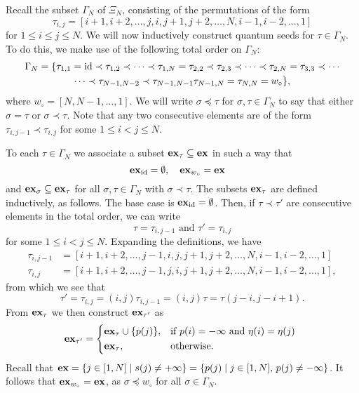 Recall the subset $\Gamma_N$ of $\Xi_N$, consisting of the permutations of the form
\begin{equation*}
	\tau_{i, j} = [i+1, i+2, \dots, j, i , j+1, j+2, \dots, N, i-1, i-2, \dots, 1]
\end{equation*}
%
for $1 \leq i \leq j \leq N$. We will now inductively construct quantum seeds for $\tau
	\in \Gamma_N$. To do this, we make use of the following total order on $\Gamma_N$:
\begin{multline*}
	\Gamma_N = \{\tau_{1,1} = \operatorname{id} \prec \tau_{1,2} \prec \cdots \prec \tau_{1, N} = \tau_{2,2} \prec \tau_{2,3} \prec \cdots \prec \tau_{2,N} = \tau_{3,3} \prec \cdots\\ \cdots \prec \tau_{N-1, N-2} \prec \tau_{N-1, N-1} \tau_{N-1, N} = \tau_{N, N} = w_\circ \},
\end{multline*}
%
where $w_\circ = [N, N-1, \dots, 1]$. We will write $\sigma \preceq \tau$ for $\sigma,
	\tau \in \Gamma_N$ to say that either $\sigma = \tau$ or $\sigma \prec \tau$. Note that
any two consecutive elements are of the form $\tau_{i, j-1} \prec \tau_{i, j}$ for some
$1 \leq i < j \leq N$.

To each $\tau \in \Gamma_N$ we associate a subset $\mathbf{ex}_\tau \subseteq \mathbf{ex}$ in such a
way that
\begin{equation*}
	\mathbf{ex}_{\operatorname{id}} = \emptyset, \quad \mathbf{ex}_{w_\circ} = \mathbf{ex} \quad
\end{equation*}
%
and $\mathbf{ex}_\sigma \subseteq \mathbf{ex}_\tau$ for all $\sigma, \tau \in \Gamma_N$ with $\sigma
	\prec \tau$. The subsets $\mathbf{ex}_\tau$ are defined inductively, as follows. The base case
is $\mathbf{ex}_{\operatorname{id}} = \emptyset$. Then, if $\tau \prec \tau'$ are consecutive elements in the
total order, we can write
\begin{equation*}
	\tau = \tau_{i,j-1} \text{ and } \tau' = \tau_{i,j}
\end{equation*}
%
for some $1 \leq i < j \leq N$. Expanding the definitions, we have
\begin{align*}
	\tau_{i, j-1} & = [i+1, i+2, \dots, j - 1, i , j, j+1, j+2, \dots, N, i-1, i-2, \dots, 1] \\
	\tau_{i, j}   & = [i+1, i+2, \dots,j-1,  j, i , j+1, j+2, \dots, N, i-1, i-2, \dots, 1],
\end{align*}
%
from which we see that
\begin{equation*}
	\tau' = \tau_{i,j} = (i, j)\tau_{i, j-1} = (i, j)\tau = \tau(j-i, j-i+1).
\end{equation*}
%
From $\mathbf{ex}_\tau$ we then construct $\mathbf{ex}_{\tau'}$ as
\begin{equation*}
	\ex_{\tau'} = \begin{dcases*}
		\ex_\tau \cup \{p(j)\}, & if $p(i) = -\infty$ and $\eta(i) = \eta(j)$ \\
		\ex_\tau,               & otherwise.
	\end{dcases*}
\end{equation*}
%
Recall that $\mathbf{ex} = \{j \in [1, N] \mid s(j) \neq + \infty \} = \{p(j) \mid j \in [1,
		N],\, p(j) \neq -\infty\}$. It follows that $\mathbf{ex}_{w_\circ} = \mathbf{ex}$, as $\sigma \preceq
	w_\circ$ for all $\sigma\in \Gamma_N$.


